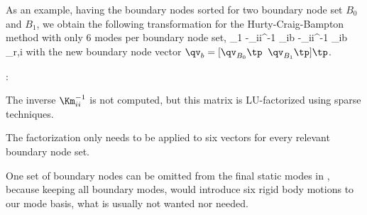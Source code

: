 As an example, having the boundary nodes sorted for two boundary node set $B_0$ and $B_1$, we obtain the following transformation for the Hurty-Craig-Bampton method with only 6 modes per boundary node set,
\be \label{theory:eigenmodes:HCBRBE2}
   \approx {} {\Null}{\Tm_1}{\Null} 
                            {-\Km_{ii}^{-1} \Km_{ib} }{-\Km_{ii}^{-1} \Km_{ib} }{\tPsi_{r,i}}   
   \eqDot
\ee
with the new boundary node vector $\qv_b = [\qv_{B_0}\tp \;\; \qv_{B_1}\tp]\tp$.

\noindent {}:
\bi
  \item The inverse $\Km_{ii}^{-1} $ is not computed, but this matrix is LU-factorized using sparse techniques.
  \item The factorization only needs to be applied to six vectors for every relevant boundary node set.
  \item One set of boundary nodes can be omitted from the final static modes in , because keeping all boundary modes, would introduce six rigid body motions to our mode basis, what is usually not wanted nor needed.
\ei

